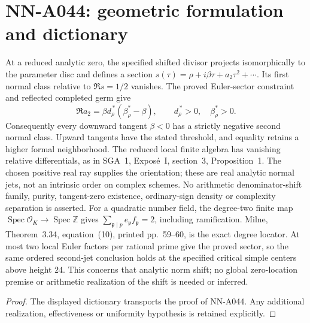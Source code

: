 \section{NN-A044: geometric formulation and dictionary}
\begin{geometricstatement}[NN-A044]
At a reduced analytic zero, the specified shifted divisor projects isomorphically to the parameter disc and defines a section $s(\tau)=\rho+i\beta\tau+a_2\tau^2+\cdots$. Its first normal class relative to $\Re s=1/2$ vanishes. The proved Euler-sector constraint and reflected completed germ give \[\Re a_2=\beta d_\rho^{\,*}(\beta_\rho^*-\beta),\qquad d_\rho^{\,*}>0,\quad\beta_\rho^*>0.\] Consequently every downward tangent $\beta<0$ has a strictly negative second normal class. Upward tangents have the stated threshold, and equality retains a higher formal neighborhood. The reduced local finite algebra has vanishing relative differentials, as in SGA~1, Expos\'e~I, section~3, Proposition~1. The chosen positive real ray supplies the orientation; these are real analytic normal jets, not an intrinsic order on complex schemes. No arithmetic denominator-shift family, purity, tangent-zero existence, ordinary-sign density or complexity separation is asserted. For a quadratic number field, the degree-two finite map $\operatorname{Spec}\mathcal O_K\to\operatorname{Spec}\mathbb Z$ gives $\sum_{\mathfrak p\mid p}e_{\mathfrak p}f_{\mathfrak p}=2$, including ramification. Milne, Theorem~3.34, equation~(10), printed pp.~59--60, is the exact degree locator. At most two local Euler factors per rational prime give the proved sector, so the same ordered second-jet conclusion holds at the specified critical simple centers above height $24$. This concerns that analytic norm shift; no global zero-location premise or arithmetic realization of the shift is needed or inferred.
\end{geometricstatement}
\begin{proof} The displayed dictionary transports the proof of NN-A044. Any additional realization, effectiveness or uniformity hypothesis is retained explicitly.\end{proof}


